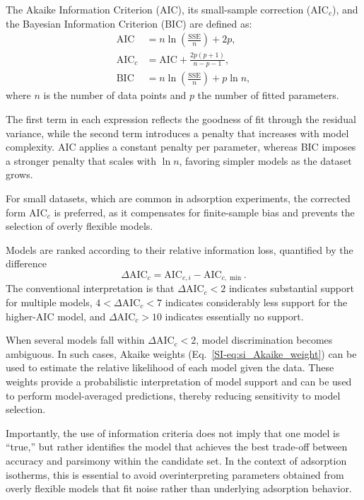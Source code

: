 \documentclass[journal=jacsat,manuscript=article]{achemso}
\begin{document}
The Akaike Information Criterion (AIC), its small-sample correction (AIC$_c$), and the Bayesian Information Criterion (BIC) are defined as:
\begin{align}
	\mathrm{AIC}   &= n\ln\!\left(\frac{\mathrm{SSE}}{n}\right) + 2p,
	\label{eq:AIC} \\[4pt]
	\mathrm{AIC}_c &= \mathrm{AIC} + \frac{2p(p+1)}{n-p-1},
	\label{eq:AICc} \\[4pt]
	\mathrm{BIC}   &= n\ln\!\left(\frac{\mathrm{SSE}}{n}\right) + p\ln n,
	\label{eq:BIC}
\end{align}
where $n$ is the number of data points and $p$ the number of fitted parameters.

The first term in each expression reflects the goodness of fit through the residual variance, while the second term introduces a penalty that increases with model complexity. AIC applies a constant penalty per parameter, whereas BIC imposes a stronger penalty that scales with $\ln n$, favoring simpler models as the dataset grows.

For small datasets, which are common in adsorption experiments, the corrected form AIC$_c$ is preferred, as it compensates for finite-sample bias and prevents the selection of overly flexible models.

Models are ranked according to their relative information loss, quantified by the difference
\begin{equation}
	\Delta\mathrm{AIC}_c = \mathrm{AIC}_{c,i} - \mathrm{AIC}_{c,\min}.
\end{equation}
The conventional interpretation is that $\Delta\mathrm{AIC}_c < 2$ indicates substantial support for multiple models, $4 < \Delta\mathrm{AIC}_c < 7$ indicates considerably less support for the higher-AIC model, and $\Delta\mathrm{AIC}_c > 10$ indicates essentially no support.

When several models fall within $\Delta\mathrm{AIC}_c < 2$, model discrimination becomes ambiguous. In such cases, Akaike weights (Eq.~\ref{SI-eq:si_Akaike_weight}) can be used to estimate the relative likelihood of each model given the data. These weights provide a probabilistic interpretation of model support and can be used to perform model-averaged predictions, thereby reducing sensitivity to model selection.

Importantly, the use of information criteria does not imply that one model is “true,” but rather identifies the model that achieves the best trade-off between accuracy and parsimony within the candidate set. In the context of adsorption isotherms, this is essential to avoid overinterpreting parameters obtained from overly flexible models that fit noise rather than underlying adsorption behavior.
\end{document}
